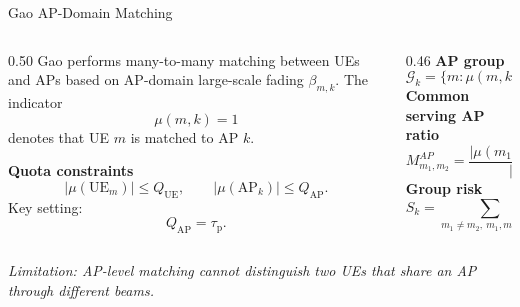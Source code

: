\documentclass[10pt,aspectratio=169]{beamer}
\newcommand{\taup}{\tau_{\mathrm{p}}}
\newcommand{\callout}[1]{%
    \vspace{0.3em}
    {\footnotesize\itshape #1}
}
\begin{document}
\begin{frame}{Gao AP-Domain Matching}
    \small
    \begin{columns}[T,onlytextwidth]
        \begin{column}{0.50\textwidth}
            Gao performs many-to-many matching between UEs and APs based on AP-domain large-scale fading \(\beta_{m,k}\). The indicator
            \[
                \mu(m,k)=1
            \]
            denotes that UE \(m\) is matched to AP \(k\).

            \vspace{0.4em}
            \textbf{Quota constraints}
            \[
                |\mu(\mathrm{UE}_m)| \le Q_{\mathrm{UE}},
                \qquad
                |\mu(\mathrm{AP}_k)| \le Q_{\mathrm{AP}}.
            \]
            Key setting:
            \[
                Q_{\mathrm{AP}}=\taup.
            \]
        \end{column}
        \begin{column}{0.46\textwidth}
            \textbf{AP group}
            \[
                \mathcal{G}_k=\{m:\mu(m,k)=1\}.
            \]
            \textbf{Common serving AP ratio}
            \[
                M_{m_1,m_2}^{AP}
                =
                \frac{|\mu(m_1,:)\cap\mu(m_2,:)|}{|\mu(m_1,:)|}.
            \]
            \textbf{Group risk}
            \[
                S_k
                =
                \sum_{m_1\neq m_2,\ m_1,m_2\in\mathcal{G}_k}
                M_{m_1,m_2}^{AP}.
            \]
        \end{column}
    \end{columns}

    \vspace{0.3em}
    \callout{Limitation: AP-level matching cannot distinguish two UEs that share an AP through different beams.}
\end{frame}
\end{document}
